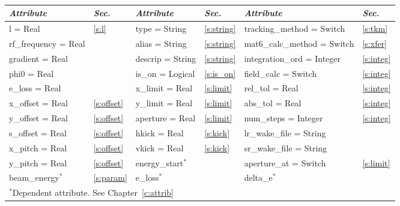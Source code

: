 {{\begin{center}
\tt
\begin{tabular}{|l|l||l|l||l|l|} \hline
  {\sl Attribute} & {\sl Sec.}  & {\sl Attribute} & {\sl Sec.} & {\sl Attribute} & {\sl Sec.} \\ \hline
  l        = Real       & \ref{s:l}      & type = String     & \ref{s:string} & tracking\_method = Switch   & \ref{s:tkm}   \\ \hline
  rf\_frequency = Real  &                & alias = String    & \ref{s:string} & mat6\_calc\_method = Switch & \ref{s:xfer}  \\ \hline
  gradient      = Real  &                & descrip = String  & \ref{s:string} & integration\_ord = Integer  & \ref{s:integ} \\ \hline
  phi0          = Real  &                & is\_on = Logical  & \ref{s:is_on}  & field\_calc = Switch        & \ref{s:integ} \\ \hline
  e\_loss       = Real  &                & x\_limit = Real   & \ref{s:limit}  & rel\_tol = Real             & \ref{s:integ} \\ \hline
  x\_offset  = Real     & \ref{s:offset} & y\_limit = Real   & \ref{s:limit}  & abs\_tol = Real             & \ref{s:integ} \\ \hline
  y\_offset  = Real     & \ref{s:offset} & aperture = Real   & \ref{s:limit}  & num\_steps = Integer        & \ref{s:integ} \\ \hline
  s\_offset  = Real     & \ref{s:offset} & hkick    = Real   & \ref{s:kick}   & lr\_wake\_file = String     &               \\ \hline
  x\_pitch = Real       & \ref{s:offset} & vkick    = Real   & \ref{s:kick}   & sr\_wake\_file = String     &               \\ \hline
  y\_pitch = Real       & \ref{s:offset} & energy\_start$^*$ &                & aperture\_at = Switch       & \ref{s:limit} \\ \hline
  beam\_energy$^*$      & \ref{s:param}  & e\_loss$^*$       &                & delta\_e$^*$                &               \\ \hline
  \multicolumn{6}{l}{\small $^*$Dependent attribute. See Chapter~\ref{c:attrib}} \\
\end{tabular}
\end{center}
\toffset

}}
